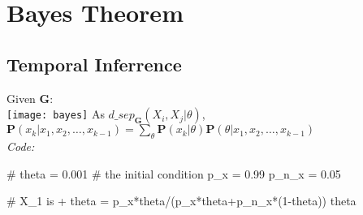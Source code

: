 \section{Bayes Theorem}
\subsection*{Temporal Inferrence}
Given $\mathbf{G}$: \\
\texttt{[image: bayes]}
As $d\_sep_{\mathbf{G}}(X_{i},X_{j}|\theta)$,\\

$\mathbf{P}(x_k|x_1,x_2,\ldots,x_{k-1}) = \sum_{\theta}{\mathbf{P}(x_k|\theta)\mathbf{P}(\theta|x_1,x_2,\ldots,x_{k-1})}$\\

\textit{Code: }
\begin{spverbatim}
# theta = 0.001 # the initial condition
p_x = 0.99
p_n_x = 0.05

# X_1 is +
theta = p_x*theta/(p_x*theta+p_n_x*(1-theta))
theta
\end{spverbatim}